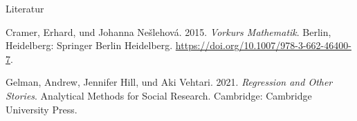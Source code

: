 \documentclass[
  ngerman,
  ignorenonframetext,
]{beamer}
\newlength{\cslhangindent}
\newenvironment{CSLReferences}[2] %
 {%
  \setlength{\parindent}{0pt}
  \ifodd #1 \everypar{\setlength{\hangindent}{\cslhangindent}}\ignorespaces\fi
  \ifnum #2 > 0
  \setlength{\parskip}{#2\baselineskip}
  \fi
 }%
 {}
\begin{document}
\begin{frame}{Literatur}
\protect\hypertarget{literatur}{}
\hypertarget{refs}{}
\begin{CSLReferences}{1}{0}
\leavevmode{}%
Cramer, Erhard, und Johanna Nešlehová. 2015. \emph{Vorkurs Mathematik}.
{Berlin, Heidelberg}: {Springer Berlin Heidelberg}.
\url{https://doi.org/10.1007/978-3-662-46400-7}.

\leavevmode{}%
Gelman, Andrew, Jennifer Hill, und Aki Vehtari. 2021. \emph{Regression
and Other Stories}. Analytical Methods for Social Research. {Cambridge}:
{Cambridge University Press}.

\end{CSLReferences}
\end{frame}
\end{document}
